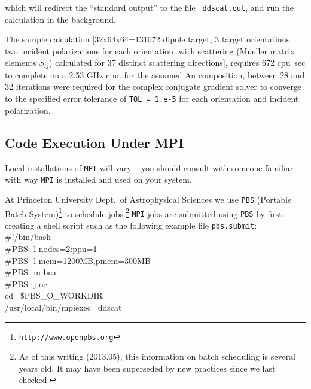 \noindent which will redirect the ``standard output'' to the file {\tt
ddscat.out}, and run the calculation in the background.  

The sample calculation 
[32x64x64=131072 dipole target, 
3 target orientations, 
two incident polarizations for each orientation, 
with scattering (Mueller matrix elements $S_{ij}$)
calculated for 37 distinct scattering directions], 
requires 672 cpu~sec to complete on a 2.53 GHz cpu.
for the assumed Au composition, between 28 and 32
iterations were required for the complex conjugate
gradient solver to converge to the specified error 
tolerance of {\tt TOL = 1.e-5} for each orientation and incident polarization.

\subsection{ Code Execution Under MPI}

Local installations of {\tt MPI} will vary -- you should consult with
someone familiar with way {\tt MPI} is installed and used on your system.

At Princeton University Dept.\ of Astrophysical Sciences we use {\tt PBS}
(Portable Batch System)\footnote{\tt http://www.openpbs.org}
to schedule jobs.\footnote{%
   As of this writing (2013.05), 
   this information on batch scheduling is several years old.
   It may have been superseded by new practices since we last checked.}
{\tt MPI} jobs are submitted using {\tt PBS} by first creating a 
shell script such as the following example file {\tt pbs.submit}:\\

\noindent
\#!/bin/bash\\
\#PBS -l nodes=2:ppn=1\\
\#PBS -l mem=1200MB,pmem=300MB\\
\#PBS -m bea\\
\#PBS -j oe\\
cd ~\$PBS\_O\_WORKDIR\\
/usr/local/bin/mpiexec ~ddscat\\

